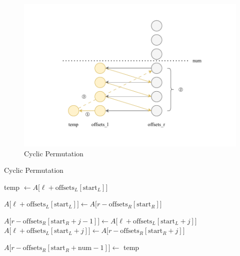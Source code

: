 \documentclass[a4paper,oneside,12pt]{book}
\begin{document}
\begin{center}
\begin{figure}[H]
    \hypertarget{fig:cyclicpermu}{}
    \caption{Cyclic Permutation}
    \centering
    \includegraphics[width=1\textwidth]{cyclicpermu.drawio.pdf}
\end{figure}
\end{center}

\begin{algorithm}[H]
\small
\caption{Cyclic Permutation}\label{CyclicPermutation}
\begin{algorithmic}
    \State temp $\gets A\bigl[\ell +
    \mathrm{offsets}_L[\mathrm{start}_L]\bigr]$  
    
    \State $A\bigl[\ell +
    \mathrm{offsets}_L[\mathrm{start}_L]\bigr] \gets
    A\bigl[r- \mathrm{offsets}_R[\mathrm{start}_R]\bigr]$
    

    \State $A\bigl[r - \mathrm{offsets}_R[\mathrm{start}_R + j - 1]\bigr] \gets
    A\bigl[\ell + \mathrm{offsets}_L[\mathrm{start}_L + j]\bigr]$     
    \State $A\bigl[\ell + \mathrm{offsets}_L[\mathrm{start}_L + j]\bigr]
    \gets A\bigl[r - \mathrm{offsets}_R[\mathrm{start}_R + j ]\bigr]$ 

    \EndFor
    \State $A\bigl[r - \mathrm{offsets}_R[\mathrm{start}_R + \mathrm{num} - 1]\bigr] \gets$
    temp 
\end{algorithmic}
\end{algorithm}
\end{document}
